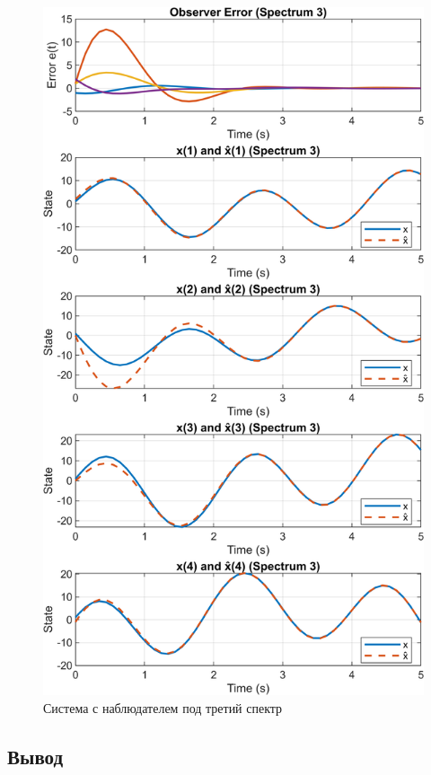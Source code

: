 \begin{figure}[H]
    \centering
    \includegraphics[width=0.8\linewidth]{figs/task2_3.png}
    \caption{Система с наблюдателем под третий спектр}
    \label{fig:2_3}
\end{figure}


\subsection{Вывод}

